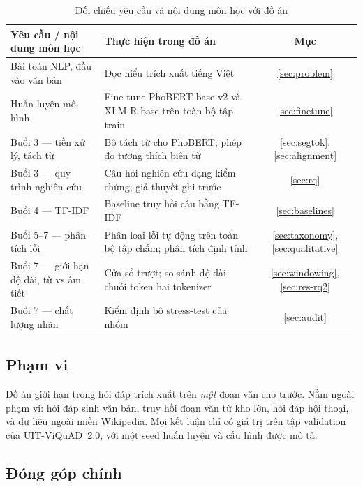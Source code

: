 \begin{table}[htbp]
\centering
\caption{Đối chiếu yêu cầu và nội dung môn học với đồ án}
\label{tab:req}
\renewcommand{\arraystretch}{1.18}
\small
\begin{tabularx}{\textwidth}{@{}L L c@{}}
\toprule
\textbf{Yêu cầu / nội dung môn học} & \textbf{Thực hiện trong đồ án} & \textbf{Mục} \\
\midrule
Bài toán NLP, đầu vào văn bản & Đọc hiểu trích xuất tiếng Việt & \ref{sec:problem} \\
Huấn luyện mô hình & Fine-tune PhoBERT-base-v2 và XLM-R-base trên toàn bộ tập train & \ref{sec:finetune} \\
Buổi 3 --- tiền xử lý, tách từ & Bộ tách từ cho PhoBERT; phép đo tương thích biên từ & \ref{sec:segtok}, \ref{sec:alignment} \\
Buổi 3 --- quy trình nghiên cứu & Câu hỏi nghiên cứu dạng kiểm chứng; giả thuyết ghi trước & \ref{sec:rq} \\
Buổi 4 --- TF-IDF & Baseline truy hồi câu bằng TF-IDF & \ref{sec:baselines} \\
Buổi 5--7 --- phân tích lỗi & Phân loại lỗi tự động trên toàn bộ tập chấm; phân tích định tính & \ref{sec:taxonomy}, \ref{sec:qualitative} \\
Buổi 7 --- giới hạn độ dài, từ vs âm tiết & Cửa sổ trượt; so sánh độ dài chuỗi token hai tokenizer & \ref{sec:windowing}, \ref{sec:res-rq2} \\
Buổi 7 --- chất lượng nhãn & Kiểm định bộ stress-test của nhóm & \ref{sec:audit} \\
\bottomrule
\end{tabularx}
\end{table}

\subsection{Phạm vi}

Đồ án giới hạn trong hỏi đáp trích xuất trên \emph{một} đoạn văn cho trước. Nằm ngoài
phạm vi: hỏi đáp sinh văn bản, truy hồi đoạn văn từ kho lớn, hỏi đáp hội thoại, và dữ liệu
ngoài miền Wikipedia. Mọi kết luận chỉ có giá trị trên tập validation của UIT-ViQuAD~2.0,
với một seed huấn luyện và cấu hình được mô tả.

\subsection{Đóng góp chính}
\label{sec:contrib}

